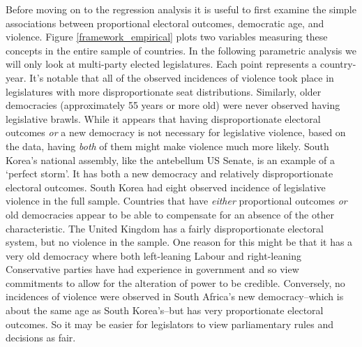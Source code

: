 \documentclass[a4paper]{article}\usepackage[]{graphicx}\usepackage[]{color}
\begin{document}
Before moving on to the regression analysis it is useful to first examine the simple associations between proportional electoral outcomes, democratic age, and violence. Figure \ref{framework_empirical} plots two variables measuring these concepts in the entire sample of countries. In the following parametric analysis we will only look at multi-party elected legislatures. Each point represents a country-year. It's notable that all of the observed incidences of violence took place in legislatures with more disproportionate seat distributions. Similarly, older democracies (approximately 55 years or more old) were never observed having legislative brawls. While it appears that having disproportionate electoral outcomes \emph{or} a new democracy is not necessary for legislative violence, based on the data, having \emph{both} of them might make violence much more likely. South Korea's national assembly, like the antebellum US Senate, is an example of a `perfect storm'. It has both a new democracy and relatively disproportionate electoral outcomes. South Korea had eight observed incidence of legislative violence in the full sample. Countries that have \emph{either} proportional outcomes \emph{or} old democracies appear to be able to compensate for an absence of the other characteristic. The United Kingdom has a fairly disproportionate electoral system, but no violence in the sample. One reason for this might be that it has a very old democracy where both left-leaning Labour and right-leaning Conservative parties have had experience in government and so view commitments to allow for the alteration of power to be credible.  Conversely, no incidences of violence were observed in South Africa's new democracy--which is about the same age as South Korea's--but has very proportionate electoral outcomes. So it may be easier for legislators to view parliamentary rules and decisions as fair.
\end{document}
